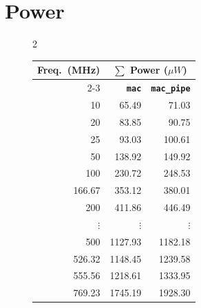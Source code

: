 \documentclass[a4paper,11pt]{article}
\begin{document}
\section{Power}
\begin{figure}[htbp]
    \centering

    \begin{multicols}{2}

        \centering
        
        \label{fig:pipe_power}

        \columnbreak

        \centering

        \begin{tabular}{rrr}
            \toprule
            \textbf{Freq.\ (MHz)} &
            \multicolumn{2}{c}{\textbf{$\sum$ Power ($\mu W$)}} \\
            \cmidrule(lr){2-3}
            & \textbf{\texttt{mac}} & \textbf{\texttt{mac\_pipe}} \\
            \midrule
            10     & 65.49 & 71.03 \\
            20     & 83.85 & 90.75 \\
            25     & 93.03 & 100.61 \\
            50     & 138.92 & 149.92 \\
            100    & 230.72 & 248.53 \\
            166.67 & 353.12 & 380.01 \\
            200    & 411.86 & 446.49 \\
            $\vdots$ & $\vdots$ & $\vdots$ \\
            500    & 1127.93 & 1182.18 \\
            526.32 & 1148.45 & 1239.58 \\
            555.56 & 1218.61 & 1333.95 \\
            769.23 & 1745.19 & 1928.30 \\
            \bottomrule
        \end{tabular}
    \end{multicols}
\end{figure}


\end{document}
